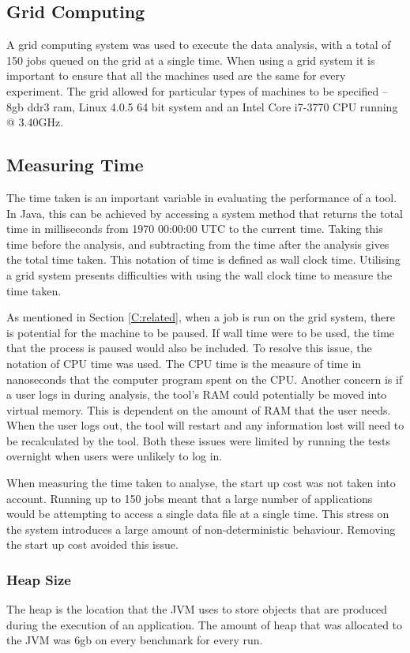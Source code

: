 \subsection{Grid Computing}
A grid computing system was used to execute the data analysis, with a total of 150 jobs queued on the grid at a single time. When using a grid system it is important to ensure that all the machines used are the same for every experiment. The grid allowed for particular types of machines to be specified -- 8gb ddr3 ram, Linux 4.0.5 64 bit system and an Intel Core i7-3770 CPU running @ 3.40GHz.

\subsection{Measuring Time}
The time taken is an important variable in evaluating the performance of a tool. In Java, this can be achieved by accessing a system method that returns the total time in milliseconds from 1970 00:00:00 UTC to the current time. Taking this time before the analysis, and subtracting from the time after the analysis gives the total time taken. This notation of time is defined as wall clock time. Utilising a grid system presents difficulties with using the wall clock time to measure the time taken. 

As mentioned in Section \ref{C:related}, when a job is run on the grid system, there is potential for the machine to be paused. If wall time were to be used, the time that the process is paused would also be included. To resolve this issue, the notation of CPU time was used. The CPU time is the measure of time in nanoseconds that the computer program spent on the CPU. Another concern is if a user logs in during analysis, the tool's RAM could potentially be moved into virtual memory. This is dependent on the amount of RAM that the user needs. When the user logs out, the tool will restart and any information lost will need to be recalculated by the tool. Both these issues were limited by running the tests overnight when users were unlikely to log in.

When measuring the time taken to analyse, the start up cost was not taken into account. Running up to 150 jobs meant that a large number of applications would be attempting to access a single data file at a single time. This stress on the system introduces a large amount of non-deterministic behaviour. Removing the start up cost avoided this issue.

\subsubsection{Heap Size}
The heap is the location that the JVM uses to store objects that are produced during the execution of an application. The amount of heap that was allocated to the JVM was 6gb on every benchmark for every run.

